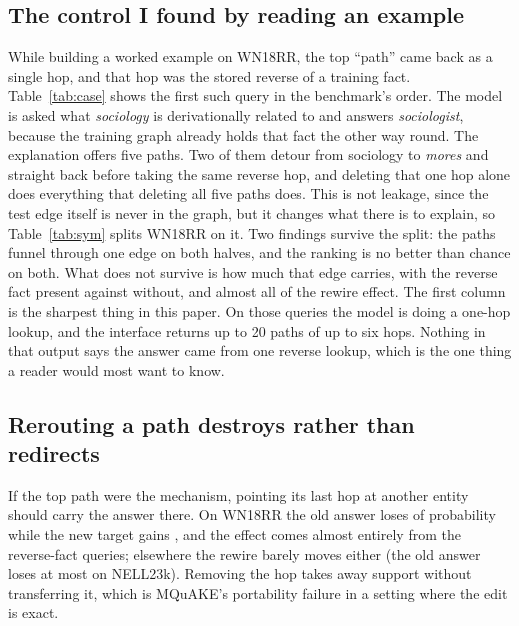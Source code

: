 \documentclass[10pt,twocolumn,letterpaper]{article}
\begin{document}
\subsection{The control I found by reading an example}
\label{sec:sym}



While building a worked example on WN18RR, the top ``path'' came back as a
single hop, and that hop was the stored reverse of a training fact.
Table~\ref{tab:case} shows the first such query in the benchmark's order. The
model is asked what \emph{sociology} is derivationally related to and answers
\emph{sociologist}, because the training graph already holds that fact the
other way round. The explanation offers five paths. Two of them detour from
sociology to \emph{mores} and straight back before taking the same reverse
hop, and deleting that one hop alone does everything that deleting all five
paths does. This is not leakage, since the test edge itself is never in the
graph, but it changes what there is to explain, so Table~\ref{tab:sym} splits
WN18RR on it. Two findings survive the split: the
paths funnel through one edge on both halves, and the ranking is no better
than chance on both. What does not survive is how much that edge carries,
\wnRevSingleEdgeRecoversFrac{} with the reverse fact present against
\wnNoRevSingleEdgeRecoversFrac{} without, and almost all of the rewire effect.
The first column is the sharpest thing in this paper. On those queries the
model is doing a one-hop lookup, and the interface returns up to 20 paths of
up to six hops. Nothing in that output says the answer came from one
reverse lookup, which is the one thing a reader would most want to know.

\subsection{Rerouting a path destroys rather than redirects}

If the top path were the mechanism, pointing its last hop at another entity
should carry the answer there. On WN18RR the old answer loses
\wnRewireDropOnGold{} of probability while the new target gains
\wnRewireGainOnTarget{}, and the effect comes almost entirely from the
reverse-fact queries; elsewhere the rewire barely moves either (the old answer
loses at most \nlRewireDropOnGold{} on NELL23k). Removing the hop takes away support without
transferring it, which is MQuAKE's portability failure \cite{mquake} in a
setting where the edit is exact.
\end{document}
